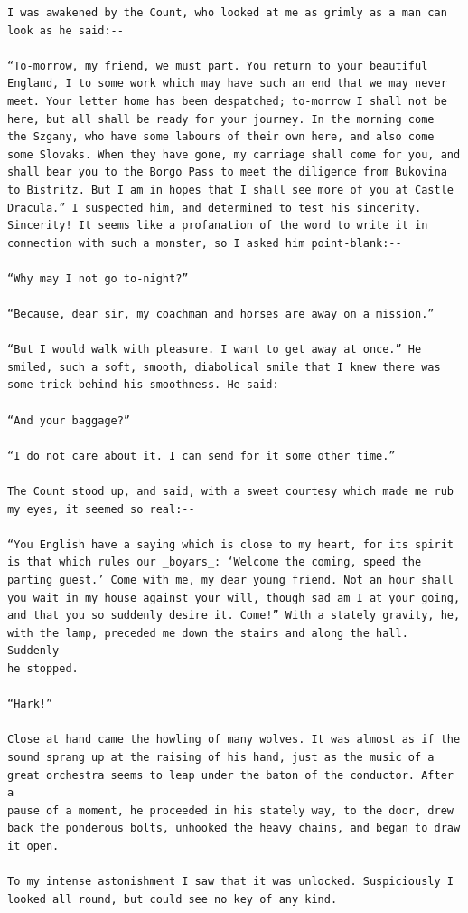 \documentclass{article}
\begin{document}
\begin{verbatim}
I was awakened by the Count, who looked at me as grimly as a man can
look as he said:--

“To-morrow, my friend, we must part. You return to your beautiful
England, I to some work which may have such an end that we may never
meet. Your letter home has been despatched; to-morrow I shall not be
here, but all shall be ready for your journey. In the morning come
the Szgany, who have some labours of their own here, and also come
some Slovaks. When they have gone, my carriage shall come for you, and
shall bear you to the Borgo Pass to meet the diligence from Bukovina
to Bistritz. But I am in hopes that I shall see more of you at Castle
Dracula.” I suspected him, and determined to test his sincerity.
Sincerity! It seems like a profanation of the word to write it in
connection with such a monster, so I asked him point-blank:--

“Why may I not go to-night?”

“Because, dear sir, my coachman and horses are away on a mission.”

“But I would walk with pleasure. I want to get away at once.” He
smiled, such a soft, smooth, diabolical smile that I knew there was
some trick behind his smoothness. He said:--

“And your baggage?”

“I do not care about it. I can send for it some other time.”

The Count stood up, and said, with a sweet courtesy which made me rub
my eyes, it seemed so real:--

“You English have a saying which is close to my heart, for its spirit
is that which rules our _boyars_: ‘Welcome the coming, speed the
parting guest.’ Come with me, my dear young friend. Not an hour shall
you wait in my house against your will, though sad am I at your going,
and that you so suddenly desire it. Come!” With a stately gravity, he,
with the lamp, preceded me down the stairs and along the hall. Suddenly
he stopped.

“Hark!”

Close at hand came the howling of many wolves. It was almost as if the
sound sprang up at the raising of his hand, just as the music of a
great orchestra seems to leap under the baton of the conductor. After a
pause of a moment, he proceeded in his stately way, to the door, drew
back the ponderous bolts, unhooked the heavy chains, and began to draw
it open.

To my intense astonishment I saw that it was unlocked. Suspiciously I
looked all round, but could see no key of any kind.


\end{verbatim}
\end{document}
